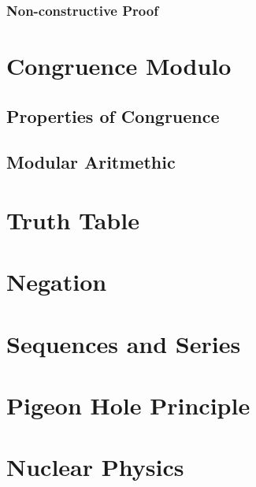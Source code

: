 \documentclass[a4paper]{article}
\begin{document}
\subsubsection{Non-constructive Proof}

\section{Congruence Modulo}

\subsection{Properties of Congruence}

\subsection{Modular Aritmethic}

\section{Truth Table}

\section{Negation}

\section{Sequences and Series}

\section{Pigeon Hole Principle}



\section{Nuclear Physics}
\end{document}
